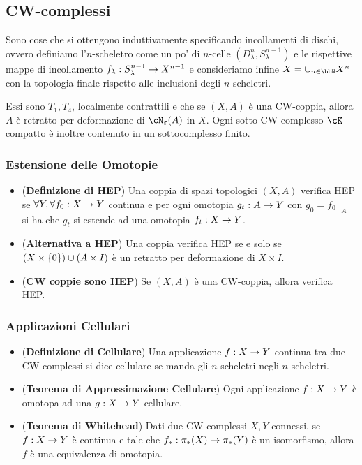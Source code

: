 \documentclass[a4paper,NoNotes,GeneralMath]{stdmdoc}
\begin{document}
\subsection*{CW-complessi}
Sono cose che si ottengono induttivamente specificando incollamenti di dischi, ovvero definiamo l'$n$-scheletro come un po' di $n$-celle $(D^n_\lambda, S^{n-1}_\lambda)$ e le rispettive mappe di incollamento $f_\lambda: S^{n-1}_\lambda \rightarrow X^{n-1}$ e consideriamo infine $X = \cup_{n \in \bbN} X^n$ con la topologia finale rispetto alle inclusioni degli $n$-scheletri.

Essi sono $T_1, T_4$, localmente contrattili e che se $(X, A)$ è una CW-coppia, allora $A$ è retratto per deformazione di $\cN_\varepsilon(A)$ in $X$.
Ogni sotto-CW-complesso $\cK$ compatto è inoltre contenuto in un sottocomplesso finito.

\subsubsection*{Estensione delle Omotopie}
\begin{itemize}
\item ({\bf Definizione di HEP}) Una coppia di spazi topologici $(X, A)$ verifica HEP se $\forall Y, \forall f_0: X \rightarrow Y$ continua e per ogni omotopia $g_t: A \rightarrow Y$ con $g_0 = f_0\mid_A$ si ha che $g_t$ si estende ad una omotopia $f_t: X \rightarrow Y$.
\item ({\bf Alternativa a HEP}) Una coppia verifica HEP se e solo se $(X \times \left\{{0}\right\}) \cup (A \times I)$ è un retratto per deformazione di $X \times I$.
\item ({\bf CW coppie sono HEP}) Se $(X, A)$ è una CW-coppia, allora verifica HEP.
\end{itemize}

\subsubsection*{Applicazioni Cellulari}
\begin{itemize}
\item ({\bf Definizione di Cellulare}) Una applicazione $f: X \rightarrow Y$ continua tra due CW-complessi si dice cellulare se manda gli $n$-scheletri negli $n$-scheletri.
\item ({\bf Teorema di Approssimazione Cellulare}) Ogni applicazione $f: X \rightarrow Y$ è omotopa ad una $g: X \rightarrow Y$ cellulare.
\item ({\bf Teorema di Whitehead}) Dati due CW-complessi $X, Y$ connessi, se $f: X \rightarrow Y$ è continua e tale che $f_*: \pi_*(X) \rightarrow \pi_*(Y)$ è un isomorfismo, allora $f$ è una equivalenza di omotopia.
\end{itemize}
\end{document}
